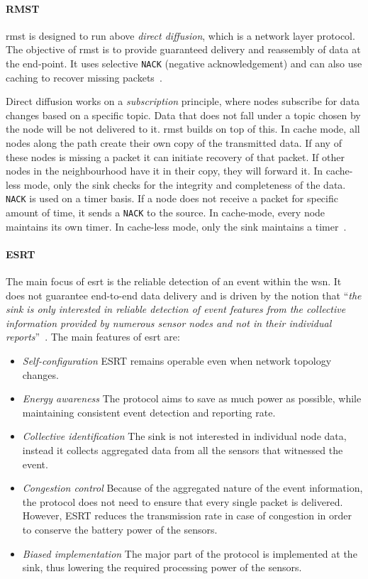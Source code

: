 \paragraph{RMST}
\acrfull{rmst} is designed to run above \textit{direct diffusion}, which is a network layer protocol. The objective of \acrshort{rmst} is to provide guaranteed delivery and reassembly of data at the end-point. It uses selective \texttt{NACK} (negative acknowledgement) and can also use caching to recover missing packets~\cite{Stann2003RMST:Networks, Sohraby2007WirelessApplications}.

Direct diffusion works on a \textit{subscription} principle, where nodes subscribe for data changes based on a specific topic. Data that does not fall under a topic chosen by the node will be not delivered to it. \acrshort{rmst} builds on top of this. In cache mode, all nodes along the path create their own copy of the transmitted data. If any of these nodes is missing a packet it can initiate recovery of that packet. If other nodes in the neighbourhood have it in their copy, they will forward it. In cache-less mode, only the sink checks for the integrity and completeness of the data. \texttt{NACK} is used on a timer basis. If a node does not receive a packet for specific amount of time, it sends a \texttt{NACK} to the source. In cache-mode, every node maintains its own timer. In cache-less mode, only the sink maintains a timer~\cite{Stann2003RMST:Networks}.

\paragraph{ESRT}
The main focus of \acrfull{esrt} is the reliable detection of an event within the \acrshort{wsn}. It does not guarantee end-to-end data delivery and is driven by the notion that ``\textit{the sink is only interested in reliable detection of event
features from the collective information provided by numerous sensor nodes and not in their individual reports}''~\cite{Sankarasubramaniam2003ESRT:Networks}. The main features of \acrshort{esrt} are:
\begin{itemize}[noitemsep, nolistsep]
    \item \textit{Self-configuration} ESRT remains operable even when network topology changes. 
    \item \textit{Energy awareness} The protocol aims to save as much power as possible, while maintaining consistent event detection and reporting rate.
    \item \textit{Collective identification} The sink is not interested in individual node data, instead it collects aggregated data from all the sensors that witnessed the event.
    \item \textit{Congestion control} Because of the aggregated nature of the event information, the protocol does not need to ensure that every single packet is delivered. However, ESRT reduces the transmission rate in case of congestion in order to conserve the battery power of the sensors.
    \item \textit{Biased implementation} The major part of the protocol is implemented at the sink, thus lowering the required processing power of the sensors.
\end{itemize}

